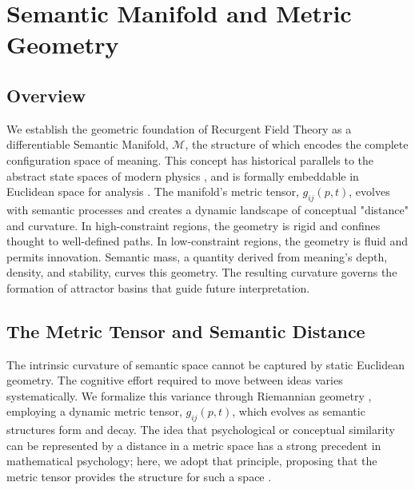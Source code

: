 \chapter{Semantic Manifold and Metric Geometry}
\label{3:semantic_manifold_and_metric_geometry}


\section{Overview}
\label{3.1:overview}

We establish the geometric foundation of Recurgent Field Theory as a differentiable Semantic Manifold, \(\mathcal{M}\), the structure of which encodes the complete configuration space of meaning. This concept has historical parallels to the abstract state spaces of modern physics \autocite{vonNeumann1932}, and is formally embeddable in Euclidean space for analysis \autocite{Whitney1936}. The manifold's metric tensor, \(g_{ij}(p, t)\), evolves with semantic processes and creates a dynamic landscape of conceptual "distance" and curvature. In high-constraint regions, the geometry is rigid and confines thought to well-defined paths. In low-constraint regions, the geometry is fluid and permits innovation. Semantic mass, a quantity derived from meaning's depth, density, and stability, curves this geometry. The resulting curvature governs the formation of attractor basins that guide future interpretation.


\section{The Metric Tensor and Semantic Distance}
\label{3.2:the_metric_tensor_and_semantic_distance}

The intrinsic curvature of semantic space cannot be captured by static Euclidean geometry. The cognitive effort required to move between ideas varies systematically. We formalize this variance through Riemannian geometry \autocite{Riemann1868, doCarmo1992}, employing a dynamic metric tensor, \(g_{ij}(p,t)\), which evolves as semantic structures form and decay. The idea that psychological or conceptual similarity can be represented by a distance in a metric space has a strong precedent in mathematical psychology; here, we adopt that principle, proposing that the metric tensor provides the structure for such a space \autocite{Shepard1987}.

